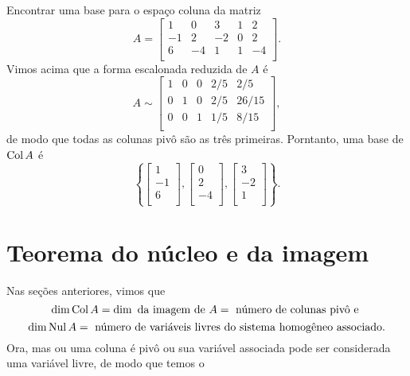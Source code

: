 \documentclass[../livro.tex]{subfiles}  %
\begin{document}
\begin{example}
	Encontrar uma base para o espaço coluna da matriz
	\[
	A = \left[
	\begin{array}{ccccc}
	1  & 0  & 3   & 1 & 2 \\
	-1 & 2  & -2  & 0 & 2 \\
	6  & -4 & 1   & 1 & -4 \\
	\end{array}
	\right].
	\] Vimos acima que a forma escalonada reduzida de $A$ é
	\[
	A \sim
	\left[
	\begin{array}{ccccc}
	1  & 0  & 0  & 2/5 & 2/5  \\
	0  & 1  & 0  & 2/5 & 26/15  \\
	0  & 0  & 1  & 1/5 & 8/15 \\
	\end{array}
	\right],
	\] de modo que todas as colunas pivô são as três primeiras. Porntanto, uma base de $\operatorname{Col} A$ é
	\[
	\left\{
	\left[
	\begin{array}{c}
	1    \\
	-1  \\
	6    \\
	\end{array}
	\right],
	\left[
	\begin{array}{c}
	0   \\
	2   \\
	-4   \\
	\end{array}
	\right],
	\left[
	\begin{array}{c}
	3  \\
	-2 \\
	1  \\
	\end{array}
	\right]
	\right\}.
	\]
\end{example}









\section{Teorema do núcleo e da imagem}


Nas seções anteriores, vimos que
\[
\operatorname{dim} \operatorname{Col} A  = \operatorname{dim} \text{ da imagem de } A  = \text{ número de colunas pivô e }
\]
\[
\operatorname{dim} \operatorname{Nul} A = \text{ número de variáveis livres do sistema homogêneo associado}.
\] Ora, mas ou uma coluna é pivô ou sua variável associada pode ser considerada uma variável livre, de modo que temos o
\end{document}

